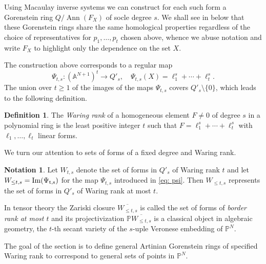 \documentclass[reqno]{amsart}
\DeclareMathOperator{\Ann}{Ann}
\newcommand{\A}{\mathbb{A}}
\renewcommand{\P}{\mathbb{P}}
\theoremstyle{plain} %
\theoremstyle{definition}
\newtheorem{definition}[theorem]{Definition}
\newtheorem{notation}[theorem]{Notation}
\theoremstyle{remark}
\begin{document}
 Using Macaulay inverse systems we can construct for each such form a Gorenstein ring $Q/\Ann(F_X)$  of socle degree $s$. 
 We shall see in   below  that  these Gorenstein rings share the same homological properties regardless of the choice of representatives for $p_1, \ldots, p_t$ chosen above,  whence we abuse notation and write $F_X$ to highlight only the dependence on the set $X$. 



The construction above 
corresponds to a regular map 
\begin{equation}\label{eq: psi}
\Psi_{t,s}: (\A^{N+1})^t\to Q'_s, \quad \Psi_{t,s}(X)=\ell_1^s+\cdots+\ell_t^s.
\end{equation}
The union over $t\geq 1$ of the images of  the  maps $\Psi_{t,s}$ covers  $Q'_s\setminus\{0\}$,
which leads to the following definition. 

\begin{definition}\label{def: Waring}
    The \emph{Waring rank} of a homogeneous element $F\neq 0$ of degree $s$ in a polynomial ring is the least positive integer $t$ such that $F=\ell_1^s+\cdots+\ell_t^s$ with $\ell_1,\ldots,\ell_t$ linear forms.  
\end{definition}



We turn our attention to sets of forms of a fixed degree and Waring rank.


\begin{notation}\label{W sets}
Let $W_{t,s}$ denote the set of forms in $Q'_s$ of Waring rank $t$ and  let  $W_{\leq t,s}=\rm{Im}(\Psi_{t,s})$ for the map $\Psi_{t,s}$ introduced in \eqref{eq: psi}. Then $W_{\leq t,s}$ represents the set of  forms in $Q'_s$ of Waring rank at most $t$. \end{notation}

In tensor theory the Zariski closure $\overline{ W_{\leq t,s}}$ is called the set of forms of {\em border rank at most $t$} and its projectivization  $\P\overline{ W_{\leq t,s}}$ is a classical object in algebraic geometry, the $t$-th secant variety of the $s$-uple Veronese embedding  of $\P^N$.


The goal of the section is to define general Artinian Gorenstein rings of specified Waring rank to correspond to general sets of points in $\P^N$.
\end{document}
